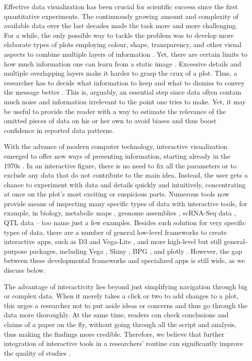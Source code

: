 \documentclass[twocolumn,10pt]{article}
\begin{document}
Effective data visualization has been crucial for scientific success since the first quantitative experiments. The continuously growing amount and complexity of available data over the last decades made the task more and more challenging. For a while, the only possible way to tackle the problem was to develop more elaborate types of plots employing colour, shape, transparency, and other visual aspects to combine multiple layers of information \citep{bertin_2011, tufte_1983, }. Yet, there are certain limits to how much information one can learn from a static image \citep{hegarty_2011}. Excessive details and multiple overlapping layers make it harder to grasp the crux of a plot. Thus, a researcher has to decide what information to keep and what to dismiss to convey the message better \citep{odonoghue_2018}. This is, arguably, an essential step since data often contain much noise and information irrelevant to the point one tries to make. Yet, it may be useful to provide the reader with a way to estimate the relevance of the omitted pieces of data on his or her own to avoid biases \citep{bresciani_2009} and thus boost confidence in reported data patterns.

With the advance of modern computer technology, interactive visualization emerged to offer new ways of presenting information, starting already in the 1970s \citep{newman_1979, becker_1987}. In an interactive figure, there is no need to fix all the parameters or to exclude any data that do not contribute to the main idea. Instead, the user gets a chance to experiment with data and details quickly and intuitively, concentrating at once on the plot's most exciting or suspicious parts. Numerous tools \citep{caldarola_2017} now provide means of inspecting many specific types of data with interactive tools, for example, in biology, metabolic maps \citep{noronha_2017}, geonome assemblies \citep{wick_2015}, scRNA-Seq data \citep{hillje_2020}, QTL data \citep{broman_2015} -- too name just a few examples. Besides such solution for very specific types of data, there are a number of general low-level frameworks to create interactive apps, such as D3 \citep{bostock_2011} and Vega-Lite \citep{satyanarayan_2015}, and more high-level but still general-purpose packages, including Vega \citep{satyanarayan_2016}, Shiny \citep{shiny}, BPG \citep{p_2019}, and plotly \citep{sievert_2019, sievert_2020}. However, the gap between these developmental frameworks and specialized apps is still wide, as we discuss below.

The advantage of interactivity lies beyond just simplifying navigation through big or complex data. When it merely takes a click or two to add changes to a plot, this urges a researcher not to put aside ideas or concerns and thus go through the data more thoroughly. At the same time, readers can check conclusions and claims of a paper on the fly, without going through all the script and analysis, thus making the findings more credible. Therefore, we believe that further integration of interactive tools in a researchers' routine can significantly improve the quality of studies \citep{shander_2016, yuk_2014}.
\end{document}
